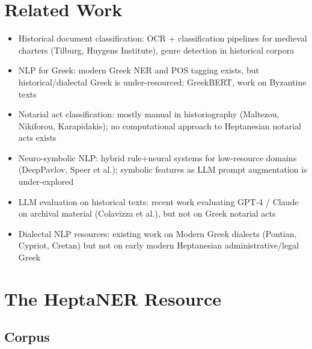\documentclass[10pt, a4paper]{article}
\begin{document}
\section{Related Work}

\begin{itemize}
\item Historical document classification: OCR + classification pipelines for medieval charters (Tilburg, Huygens Institute), genre detection in historical corpora
\item NLP for Greek: modern Greek NER and POS tagging exists, but historical/dialectal Greek is under-resourced; GreekBERT, work on Byzantine texts
\item Notarial act classification: mostly manual in historiography (Maltezou, Nikiforou, Karapidakis); no computational approach to Heptanesian notarial acts exists
\item Neuro-symbolic NLP: hybrid rule+neural systems for low-resource domains (DeepPavlov, Speer et al.); symbolic features as LLM prompt augmentation is under-explored
\item LLM evaluation on historical texts: recent work evaluating GPT-4 / Claude on archival material (Colavizza et al.), but not on Greek notarial acts
\item Dialectal NLP resources: existing work on Modern Greek dialects (Pontian, Cypriot, Cretan) but not on early modern Heptanesian administrative/legal Greek
\end{itemize}


\section{The HeptaNER Resource}

\subsection{Corpus}
\end{document}
